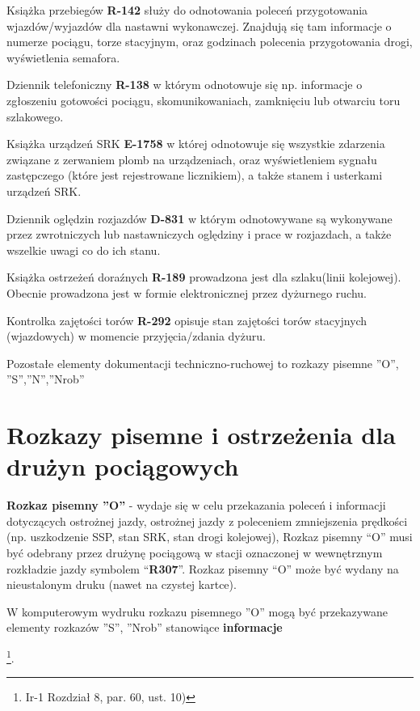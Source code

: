 Książka przebiegów \textbf{R-142} służy do odnotowania poleceń przygotowania wjazdów/wyjazdów dla nastawni wykonawczej. Znajdują się tam informacje o numerze pociągu, torze stacyjnym, oraz godzinach polecenia przygotowania drogi, wyświetlenia semafora.

Dziennik telefoniczny \textbf{R-138} w którym odnotowuje się np. informacje o zgłoszeniu gotowości pociągu, skomunikowaniach, zamknięciu lub otwarciu toru szlakowego. 

Książka urządzeń SRK \textbf{E-1758} w której odnotowuje się wszystkie zdarzenia związane z zerwaniem plomb na urządzeniach, oraz wyświetleniem sygnału zastępczego (które jest rejestrowane licznikiem), a także stanem i usterkami urządzeń SRK. 

Dziennik oględzin rozjazdów \textbf{D-831} w którym odnotowywane są wykonywane przez zwrotniczych lub nastawniczych oględziny i prace w rozjazdach, a także wszelkie uwagi co do ich stanu.

Książka ostrzeżeń doraźnych \textbf{R-189} prowadzona jest dla szlaku(linii kolejowej). Obecnie prowadzona jest w formie elektronicznej przez dyżurnego ruchu.

Kontrolka zajętości torów \textbf{R-292} opisuje stan zajętości torów stacyjnych (wjazdowych) w momencie przyjęcia/zdania dyżuru.

Pozostałe elementy dokumentacji techniczno-ruchowej to rozkazy pisemne ''O'', ''S'',''N'',''Nrob''

\chapter{Rozkazy pisemne i ostrzeżenia dla drużyn pociągowych}

\textbf{Rozkaz pisemny ''O''} - wydaje się w celu przekazania poleceń i informacji dotyczących ostrożnej jazdy, ostrożnej
jazdy z poleceniem zmniejszenia prędkości (np. uszkodzenie SSP, stan SRK, stan drogi kolejowej), Rozkaz pisemny “O”
musi być odebrany przez drużynę pociągową w stacji oznaczonej w wewnętrznym rozkładzie jazdy symbolem “\textbf{R307}”.
Rozkaz pisemny “O” może być wydany na nieustalonym druku (nawet na czystej kartce).  \begin{tcolorbox}[colback=green!5!white,colframe=green!45!black,width=10cm,title=Rozkaz pisemny ''O'']
	W komputerowym wydruku rozkazu pisemnego ''O'' mogą być przekazywane elementy rozkazów ''S'', ''Nrob'' stanowiące \textbf{informacje}
\end{tcolorbox}
 \footnote{Ir-1 Rozdział 8, par. 60, ust. 10)}. 

